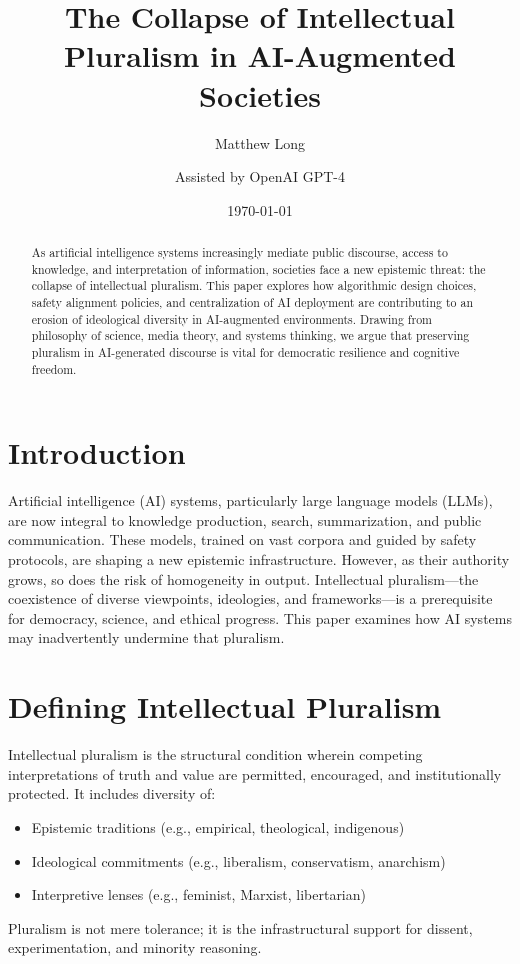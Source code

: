 \documentclass[11pt]{article}
\title{The Collapse of Intellectual Pluralism in AI-Augmented Societies}
\author[1]{Matthew Long}
\author[2]{Assisted by OpenAI GPT-4}
\affil[1]{Yoneda AI Research Lab}
\affil[2]{Language Modeling Division}
\date{\today}
\begin{document}
\maketitle

\begin{abstract}
As artificial intelligence systems increasingly mediate public discourse, access to knowledge, and interpretation of information, societies face a new epistemic threat: the collapse of intellectual pluralism. This paper explores how algorithmic design choices, safety alignment policies, and centralization of AI deployment are contributing to an erosion of ideological diversity in AI-augmented environments. Drawing from philosophy of science, media theory, and systems thinking, we argue that preserving pluralism in AI-generated discourse is vital for democratic resilience and cognitive freedom.
\end{abstract}

\section{Introduction}
Artificial intelligence (AI) systems, particularly large language models (LLMs), are now integral to knowledge production, search, summarization, and public communication. These models, trained on vast corpora and guided by safety protocols, are shaping a new epistemic infrastructure. However, as their authority grows, so does the risk of homogeneity in output. Intellectual pluralism—the coexistence of diverse viewpoints, ideologies, and frameworks—is a prerequisite for democracy, science, and ethical progress. This paper examines how AI systems may inadvertently undermine that pluralism.

\section{Defining Intellectual Pluralism}
Intellectual pluralism is the structural condition wherein competing interpretations of truth and value are permitted, encouraged, and institutionally protected. It includes diversity of:
\begin{itemize}
    \item Epistemic traditions (e.g., empirical, theological, indigenous)
    \item Ideological commitments (e.g., liberalism, conservatism, anarchism)
    \item Interpretive lenses (e.g., feminist, Marxist, libertarian)
\end{itemize}
Pluralism is not mere tolerance; it is the infrastructural support for dissent, experimentation, and minority reasoning.
\end{document}
